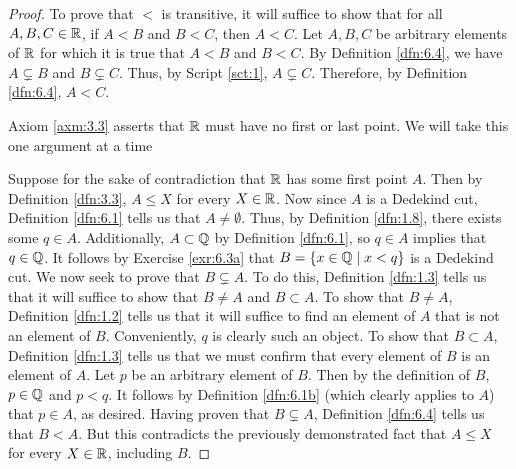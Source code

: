 \documentclass[../main.tex]{subfiles}
\begin{document}
\begin{exercise}
\begin{proof}
        To prove that $<$ is transitive, it will suffice to show that for all $A,B,C\in\mathbb{R}$, if $A<B$ and $B<C$, then $A<C$. Let $A,B,C$ be arbitrary elements of $\mathbb{R}$ for which it is true that $A<B$ and $B<C$. By Definition \ref{dfn:6.4}, we have $A\subsetneq B$ and $B\subsetneq C$. Thus, by Script \ref{sct:1}, $A\subsetneq C$. Therefore, by Definition \ref{dfn:6.4}, $A<C$.\par\medskip
        Axiom \ref{axm:3.3} asserts that $\mathbb{R}$ must have no first or last point. We will take this one argument at a time\par
        Suppose for the sake of contradiction that $\mathbb{R}$ has some first point $A$. Then by Definition \ref{dfn:3.3}, $A\leq X$ for every $X\in\mathbb{R}$. Now since $A$ is a Dedekind cut, Definition \ref{dfn:6.1} tells us that $A\neq\emptyset$. Thus, by Definition \ref{dfn:1.8}, there exists some $q\in A$. Additionally, $A\subset\mathbb{Q}$ by Definition \ref{dfn:6.1}, so $q\in A$ implies that $q\in\mathbb{Q}$. It follows by Exercise \ref{exr:6.3a} that $B=\{x\in\mathbb{Q}\mid x<q\}$ is a Dedekind cut. We now seek to prove that $B\subsetneq A$. To do this, Definition \ref{dfn:1.3} tells us that it will suffice to show that $B\neq A$ and $B\subset A$. To show that $B\neq A$, Definition \ref{dfn:1.2} tells us that it will suffice to find an element of $A$ that is not an element of $B$. Conveniently, $q$ is clearly such an object. To show that $B\subset A$, Definition \ref{dfn:1.3} tells us that we must confirm that every element of $B$ is an element of $A$. Let $p$ be an arbitrary element of $B$. Then by the definition of $B$, $p\in\mathbb{Q}$ and $p<q$. It follows by Definition \ref{dfn:6.1b} (which clearly applies to $A$) that $p\in A$, as desired. Having proven that $B\subsetneq A$, Definition \ref{dfn:6.4} tells us that $B<A$. But this contradicts the previously demonstrated fact that $A\leq X$ for every $X\in\mathbb{R}$, including $B$.\par

\end{proof}
\end{exercise}
\end{document}
